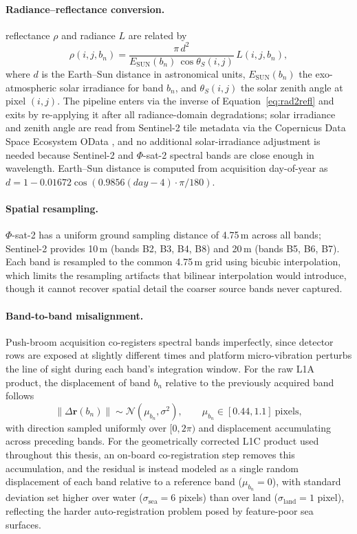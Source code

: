 \paragraph{Radiance--reflectance conversion.}  reflectance $\rho$ and  radiance $L$ are related by
\begin{equation}
    \rho(i,j,b_n) = \frac{\pi\, d^2}{E_{\text{SUN}}(b_n)\,\cos\theta_S(i,j)}\, L(i,j,b_n),
    \label{eq:rad2refl}
\end{equation}
where $d$ is the Earth--Sun distance in astronomical units, $E_{\text{SUN}}(b_n)$ the exo-atmospheric solar irradiance for band $b_n$, and $\theta_S(i,j)$ the solar zenith angle at pixel $(i,j)$.
The pipeline enters via the inverse of Equation~\eqref{eq:rad2refl} and exits by re-applying it after all radiance-domain degradations; solar irradiance and zenith angle are read from Sentinel-2 tile metadata via the Copernicus Data Space Ecosystem OData , and no additional solar-irradiance adjustment is needed because Sentinel-2 and $\Phi$-sat-2 spectral bands are close enough in wavelength.
Earth--Sun distance is computed from acquisition day-of-year as $d = 1 - 0.01672\cos(0.9856(day - 4)\cdot \pi/180)$.

\paragraph{Spatial resampling.} $\Phi$-sat-2 has a uniform ground sampling distance of 4.75\,m across all bands; Sentinel-2 provides 10\,m (bands B2, B3, B4, B8) and 20\,m (bands B5, B6, B7).
Each band is resampled to the common 4.75\,m grid using bicubic interpolation, which limits the resampling artifacts that bilinear interpolation would introduce, though it cannot recover spatial detail the coarser source bands never captured.

\paragraph{Band-to-band misalignment.}
Push-broom acquisition co-registers spectral bands imperfectly, since detector rows are exposed at slightly different times and platform micro-vibration perturbs the line of sight during each band's integration window.
For the raw L1A product, the displacement of band $b_n$ relative to the previously acquired band follows
\begin{equation}
    \|\Delta \mathbf{r}(b_n)\| \sim \mathcal{N}(\mu_{b_n}, \sigma^2), \qquad \mu_{b_n} \in [0.44, 1.1]\ \text{pixels},
    \label{eq:misalign-l1a}
\end{equation}
with direction sampled uniformly over $[0, 2\pi)$ and displacement accumulating across preceding bands.
For the geometrically corrected L1C product used throughout this thesis, an on-board co-registration step removes this accumulation, and the residual is instead modeled as a single random displacement of each band relative to a reference band ($\mu_{b_n} = 0$), with standard deviation set higher over water ($\sigma_{\text{sea}} = 6$ pixels) than over land ($\sigma_{\text{land}} = 1$ pixel), reflecting the harder auto-registration problem posed by feature-poor sea surfaces.

